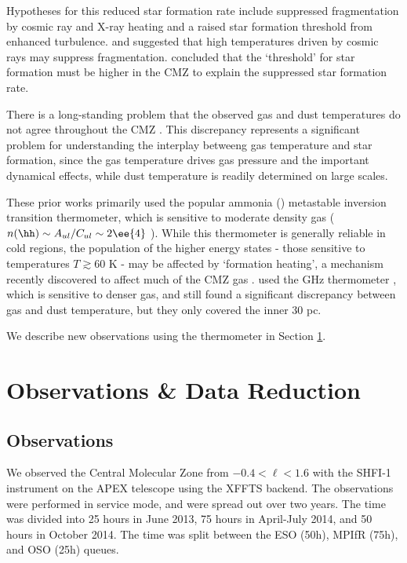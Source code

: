 Hypotheses for this reduced star formation rate include suppressed
fragmentation by cosmic ray and X-ray heating and a raised star formation
threshold from enhanced turbulence.  \citet{Papadopoulos2010a} and
\citet{Papadopoulos2011a} suggested that high temperatures driven by cosmic
rays may suppress fragmentation.  \citet{Kruijssen2014c} concluded that the
`threshold' for star formation must be higher in the CMZ to explain the
suppressed star formation rate.  

There is a long-standing problem that the observed gas and dust temperatures do
not agree throughout the CMZ
\citep{Guesten1981a,Ao2013a,Ott2014a,Molinari2011a}.  This discrepancy
represents a significant problem for understanding the interplay betweeng gas
temperature and star formation, since the gas temperature drives gas pressure
and the important dynamical effects, while dust temperature is readily
determined on large scales.

These prior works primarily used the popular ammonia (\ammonia) metastable
inversion transition thermometer, which is sensitive to moderate density gas
($n(\hh) \sim A_{ul}/C_{ul} \sim 2\ee{4}$ \percc).  While this thermometer is
generally reliable in cold regions, the population of the higher energy states
- those sensitive to temperatures $T\gtrsim60$ K - may be affected by
`formation heating', a mechanism recently discovered to affect much of the CMZ
gas \citep[][]{Lis2014a,Mills2013a}.  \citet{Ao2013a} used the  GHz
thermometer \citep{Mangum1993a}, which is sensitive to denser gas, and still
found a significant discrepancy between gas and dust temperature, but they only
covered the inner 30 pc.

We describe new observations using the \para thermometer in Section
\ref{sec:observations}.


\section{Observations \& Data Reduction}
\label{sec:observations}

\subsection{Observations}
We observed the Central Molecular Zone from $-0.4 < \ell < 1.6$ with the SHFI-1
instrument \citep{Vassilev2008a} on the APEX telescope using the XFFTS backend.
The observations were performed in service mode, and were spread out over two
years.  The time was divided into 25 hours in June 2013, 75 hours in April-July
2014, and 50 hours in October 2014.  The time was split between the ESO (50h),
MPIfR (75h), and OSO (25h) queues.

